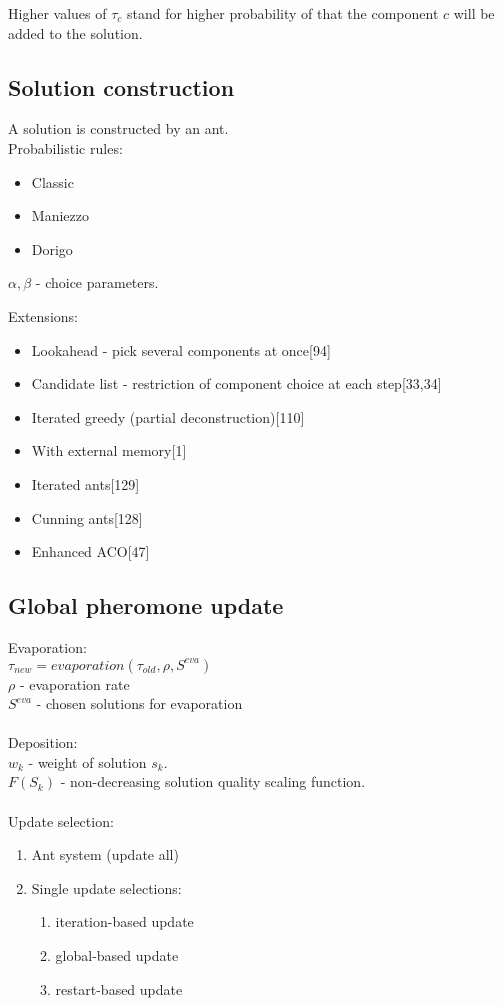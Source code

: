 \documentclass[12pt]{article}
\begin{document}
Higher values of $\tau_c$ stand for higher probability of that the component $c$ will be added to the solution.

\subsection{Solution construction}

A solution is constructed by an ant. \\
Probabilistic rules: \\
\begin{itemize}
\item {Classic}
\item {Maniezzo}
\item {Dorigo}
\end{itemize}

$\alpha, \beta$ - choice parameters.

Extensions:
\begin{itemize}
\item {Lookahead - pick several components at once[94]}
\item {Candidate list - restriction of component choice at each step[33,34]}
\item {Iterated greedy (partial deconstruction)[110]}
\item {With external memory[1]}
\item {Iterated ants[129]}
\item {Cunning ants[128]}
\item {Enhanced ACO[47]}
\end{itemize}

\subsection{Global pheromone update}
Evaporation: \\
$\tau_{new}=evaporation(\tau_{old}, \rho, S^{eva})$ \\
$\rho$ - evaporation rate \\
$S^{eva}$ - chosen solutions for evaporation \\ \\

Deposition: \\
$w_k$ - weight of solution $s_k$. \\
$F(S_k)$ - non-decreasing solution quality scaling function. \\ \\

Update selection:
\begin{enumerate}
\item {Ant system (update all)}
\item {Single update selections:}
\begin{enumerate}
\item {iteration-based update}
\item {global-based update}
\item {restart-based update}
\end{enumerate}
\end{enumerate}
\end{document}
